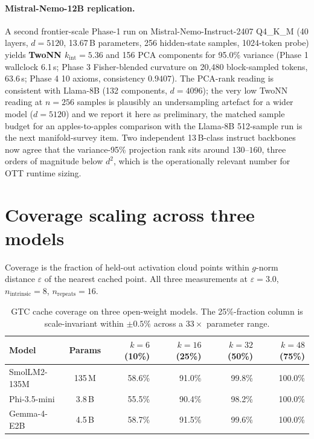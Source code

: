 \documentclass[11pt]{article}
\begin{document}
\paragraph{Mistral-Nemo-12B replication.}  A second frontier-scale Phase-1
run on Mistral-Nemo-Instruct-2407 Q4\_K\_M (40 layers, $d{=}5120$,
13.67\,B parameters, 256 hidden-state samples, 1024-token probe) yields
\textbf{TwoNN $k_\text{int}{=}5.36$} and 156 PCA components for
95.0\% variance (Phase 1 wallclock 6.1\,s; Phase 3 Fisher-blended
curvature on 20{,}480 block-sampled tokens, 63.6\,s; Phase 4 10 axioms,
consistency $0.9407$).  The PCA-rank reading is consistent with
Llama-8B (132 components, $d{=}4096$); the very low TwoNN reading at
$n{=}256$ samples is plausibly an undersampling artefact for a wider
model ($d{=}5120$) and we report it here as preliminary, the matched
sample budget for an apples-to-apples comparison with the Llama-8B
512-sample run is the next manifold-survey item.  Two independent
13\,B-class instruct backbones now agree that the variance-95\%
projection rank sits around $130\text{--}160$, three orders of magnitude
below $d^2$, which is the operationally relevant number for OTT runtime
sizing.

\section{Coverage scaling across three models}
\label{sec:coverage}

Coverage is the fraction of held-out activation cloud points within $g$-norm
distance $\varepsilon$ of the nearest cached point. All three measurements at
$\varepsilon=3.0$, $n_{\mathrm{intrinsic}}=8$, $n_{\mathrm{repeats}}=16$.

\begin{table}[h]
\centering\small
\begin{tabular}{lcrrrr}
\toprule
Model & Params & $k=6$ (10\%) & $k=16$ (25\%) & $k=32$ (50\%) & $k=48$ (75\%)\\
\midrule
SmolLM2-135M & 135\,M & 58.6\% & 91.0\% & 99.8\% & 100.0\%\\
Phi-3.5-mini & 3.8\,B & 55.5\% & 90.4\% & 98.2\% & 100.0\%\\
Gemma-4-E2B  & 4.5\,B & 58.7\% & 91.5\% & 99.6\% & 100.0\%\\
\bottomrule
\end{tabular}
\caption{GTC cache coverage on three open-weight models. The 25\%-fraction
column is scale-invariant within $\pm 0.5\%$ across a $33\times$ parameter
range.}
\end{table}
\end{document}
